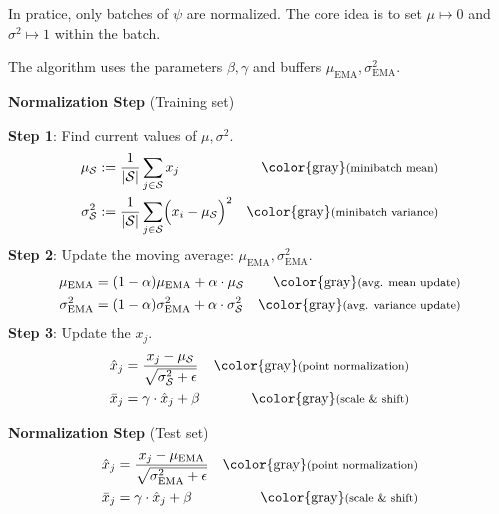 In pratice, only batches of $\psi$ are normalized. The core idea is to set $\mu \mapsto 0$ and $\sigma^2 \mapsto 1$ within the batch.\\

The algorithm uses the parameters $\beta, \gamma$ and buffers $\mu_\text{EMA}, \sigma^2_\text{EMA}$.\\

\textbf{Normalization Step} (Training set)\\

\textbf{Step 1}: Find current values of $\mu, \sigma^2$.
\begin{align*}
    \mu_\mathcal{S}         &:= \frac{1}{|\mathcal{S}|}\sum_{j\in\mathcal{S}}x_j                                    & \text{\color{gray}\footnotesize(minibatch mean)}       \\
    \sigma^2_\mathcal{S}    &:= \frac{1}{|\mathcal{S}|}\sum_{j\in\mathcal{S}}\Bigl( x_i-\mu_\mathcal{S} \Bigr)^2    & \text{\color{gray}\footnotesize(minibatch variance)} 
\end{align*}
\textbf{Step 2}: Update the moving average: $\mu_\text{EMA},\sigma^2_\text{EMA}$.
\begin{align*}
    \mu_\text{EMA}          &= (1-\alpha)\mu_\text{EMA} + \alpha \cdot \mu_\mathcal{S}                              & \text{\color{gray}\footnotesize(avg. mean update)}     \\
    \sigma^2_\text{EMA}     &= (1-\alpha)\sigma^2_\text{EMA}+\alpha\cdot \sigma_\mathcal{S}^2                       & \text{\color{gray}\footnotesize(avg. variance update)} 
\end{align*}
\textbf{Step 3}: Update the $x_j$.
\begin{align*}
    \hat{x}_j               &= \frac{x_j-\mu_\mathcal{S}}{\sqrt{\sigma^2_\mathcal{S} + \epsilon}}                   & \text{\color{gray}\footnotesize(point normalization)}  \\
    \bar{x}_j               &= \gamma\cdot\hat{x}_j + \beta                                                         & \text{\color{gray}\footnotesize(scale \& shift)}
\end{align*}

\textbf{Normalization Step} (Test set)\\
\begin{align*}
    \hat{x}_j               &= \frac{x_j-\mu_\text{EMA}}{\sqrt{\sigma^2_\text{EMA}+\epsilon}}                       & \text{\color{gray}\footnotesize(point normalization)}  \\
    \bar{x}_j               &= \gamma\cdot\hat{x}_j + \beta                                                         & \text{\color{gray}\footnotesize(scale \& shift)}     
\end{align*}

